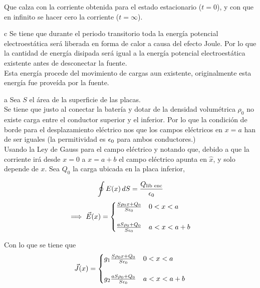 \begin{solucion}{6}
Que calza con la corriente obtenida para el estado estacionario ($t=0$), y con que en infinito se hacer cero la corriente ($t=\infty$). 

\ics c
Se tiene que durante el periodo transitorio toda la energía potencial electroestática será liberada en forma de calor a causa del efecto Joule. Por lo que la cantidad de energía disipada será igual a la energía potencial electroestática existente antes de desconectar la fuente.\\

Esta energía procede del movimiento de cargas aun existente, originalmente esta energía fue proveída por la fuente. 

\end{solucion}

\bigbreak

\begin{solucion}{7}
\ics a
Sea $S$ el área de la superficie de las placas.\\

Se tiene que justo al conectar la batería y dotar de la densidad volumétrica $\rho_0$ no existe carga entre el conductor superior y el inferior. Por lo que la condición de borde para el desplazamiento eléctrico nos  que los campos eléctricos en $x = a$ han de ser iguales (la permitividad es $\epsilon_0$ para ambos conductores.)\\

Usando la Ley de Gauss para el campo eléctrico y notando que, debido a que la corriente irá desde $x=0$ a $x=a+b$ el campo eléctrico apunta en $\hat{x}$, y solo depende de $x$. Sea $Q_0$ la carga ubicada en la placa inferior,

\[ \oint E(x)\,dS = \frac{Q_{\text{lib enc}}}{\epsilon_0}\]
\[
    \implies \vec E (x) = 
        \begin{cases}
            \frac{S\rho_0x + Q_0}{S\epsilon_0} & 0 < x < a\\
            \\
            \frac{aS\rho_0 + Q_0}{S\epsilon_0} & a < x < a+b
        \end{cases}
\]

Con lo que se tiene que
\[ \vec J (x) = 
        \begin{cases}
            g_1\frac{S\rho_0x + Q_0}{S\epsilon_0} & 0 < x < a\\
            \\
            g_2\frac{aS\rho_0 + Q_0}{S\epsilon_0} & a < x < a+b
        \end{cases}\]


\end{solucion}
